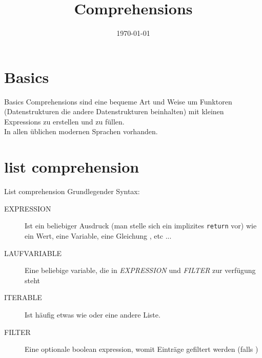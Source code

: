 


\newcommand{\topic}{
	Comprehensions
}

\title{\topic}
\supertitle{\course}
\date{\today}



\maketitle

\begin{frame}
	\tableofcontents
\end{frame}



\section{Basics}
\begin{frame}{Basics}
  Comprehensions sind eine bequeme Art und Weise um Funktoren (Datenstrukturen die andere Datenstrukturen beinhalten) mit kleinen Expressions zu erstellen und zu füllen.\\
  In allen üblichen modernen Sprachen vorhanden.
\end{frame}

\section{list comprehension}
\begin{frame}{List comprehension}
  Grundlegender Syntax: \\
  \begin{description}
    \item[EXPRESSION] Ist ein beliebiger Ausdruck (man stelle sich ein implizites \texttt{return} vor) wie ein Wert, eine Variable, eine Gleichung , etc ...
    \item[LAUFVARIABLE] Eine beliebige variable, die in \textit{EXPRESSION} und \textit{FILTER} zur verfügung steht
    \item[ITERABLE] Ist häufig etwas wie  oder eine andere Liste.
    \item[FILTER] Eine optionale boolean expression, womit Einträge gefiltert werden (falls )
  \end{description}


\end{frame}

